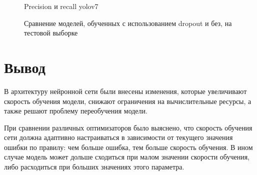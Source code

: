 \begin{figure}[H]
	\begin{center}
		\caption{Precision и recall yolov7}
		\label{img:yolov7_precision_recall}
	\end{center}
\end{figure}

\begin{figure}[H]
	\begin{center}
		\caption{Сравнение моделей, обученных с использованием dropout и без, на тестовой выборке}
		\label{img:dropout_test}
	\end{center}
\end{figure}


\section{Вывод}
В архитектуру нейронной сети были внесены изменения, которые увеличивают скорость обучения модели, снижают ограничения на вычислительные ресурсы, а также решают проблему переобучения модели.

При сравнении различных оптимизаторов было выяснено, что скорость обучения сети должна адаптивно настраиваться в зависимости от текущего значения ошибки по правилу: чем больше ошибка, тем больше скорость обучения. В ином случае модель может дольше сходиться при малом значении скорости обучения, либо расходиться при больших значениях этого параметра.

